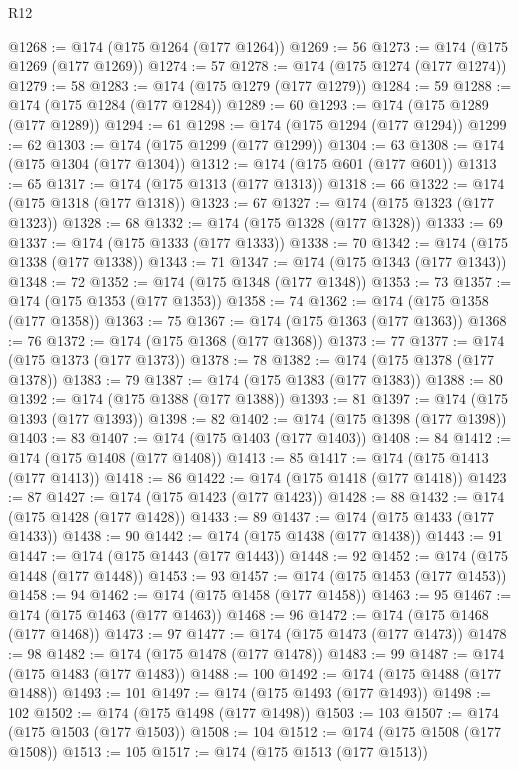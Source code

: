 \begin{lexlean}{R12}
\begin{coremodule}
@1268 := @174 (@175 @1264 (@177 @1264))
@1269 := 56
@1273 := @174 (@175 @1269 (@177 @1269))
@1274 := 57
@1278 := @174 (@175 @1274 (@177 @1274))
@1279 := 58
@1283 := @174 (@175 @1279 (@177 @1279))
@1284 := 59
@1288 := @174 (@175 @1284 (@177 @1284))
@1289 := 60
@1293 := @174 (@175 @1289 (@177 @1289))
@1294 := 61
@1298 := @174 (@175 @1294 (@177 @1294))
@1299 := 62
@1303 := @174 (@175 @1299 (@177 @1299))
@1304 := 63
@1308 := @174 (@175 @1304 (@177 @1304))
@1312 := @174 (@175 @601 (@177 @601))
@1313 := 65
@1317 := @174 (@175 @1313 (@177 @1313))
@1318 := 66
@1322 := @174 (@175 @1318 (@177 @1318))
@1323 := 67
@1327 := @174 (@175 @1323 (@177 @1323))
@1328 := 68
@1332 := @174 (@175 @1328 (@177 @1328))
@1333 := 69
@1337 := @174 (@175 @1333 (@177 @1333))
@1338 := 70
@1342 := @174 (@175 @1338 (@177 @1338))
@1343 := 71
@1347 := @174 (@175 @1343 (@177 @1343))
@1348 := 72
@1352 := @174 (@175 @1348 (@177 @1348))
@1353 := 73
@1357 := @174 (@175 @1353 (@177 @1353))
@1358 := 74
@1362 := @174 (@175 @1358 (@177 @1358))
@1363 := 75
@1367 := @174 (@175 @1363 (@177 @1363))
@1368 := 76
@1372 := @174 (@175 @1368 (@177 @1368))
@1373 := 77
@1377 := @174 (@175 @1373 (@177 @1373))
@1378 := 78
@1382 := @174 (@175 @1378 (@177 @1378))
@1383 := 79
@1387 := @174 (@175 @1383 (@177 @1383))
@1388 := 80
@1392 := @174 (@175 @1388 (@177 @1388))
@1393 := 81
@1397 := @174 (@175 @1393 (@177 @1393))
@1398 := 82
@1402 := @174 (@175 @1398 (@177 @1398))
@1403 := 83
@1407 := @174 (@175 @1403 (@177 @1403))
@1408 := 84
@1412 := @174 (@175 @1408 (@177 @1408))
@1413 := 85
@1417 := @174 (@175 @1413 (@177 @1413))
@1418 := 86
@1422 := @174 (@175 @1418 (@177 @1418))
@1423 := 87
@1427 := @174 (@175 @1423 (@177 @1423))
@1428 := 88
@1432 := @174 (@175 @1428 (@177 @1428))
@1433 := 89
@1437 := @174 (@175 @1433 (@177 @1433))
@1438 := 90
@1442 := @174 (@175 @1438 (@177 @1438))
@1443 := 91
@1447 := @174 (@175 @1443 (@177 @1443))
@1448 := 92
@1452 := @174 (@175 @1448 (@177 @1448))
@1453 := 93
@1457 := @174 (@175 @1453 (@177 @1453))
@1458 := 94
@1462 := @174 (@175 @1458 (@177 @1458))
@1463 := 95
@1467 := @174 (@175 @1463 (@177 @1463))
@1468 := 96
@1472 := @174 (@175 @1468 (@177 @1468))
@1473 := 97
@1477 := @174 (@175 @1473 (@177 @1473))
@1478 := 98
@1482 := @174 (@175 @1478 (@177 @1478))
@1483 := 99
@1487 := @174 (@175 @1483 (@177 @1483))
@1488 := 100
@1492 := @174 (@175 @1488 (@177 @1488))
@1493 := 101
@1497 := @174 (@175 @1493 (@177 @1493))
@1498 := 102
@1502 := @174 (@175 @1498 (@177 @1498))
@1503 := 103
@1507 := @174 (@175 @1503 (@177 @1503))
@1508 := 104
@1512 := @174 (@175 @1508 (@177 @1508))
@1513 := 105
@1517 := @174 (@175 @1513 (@177 @1513))

\end{coremodule}
\end{lexlean}
